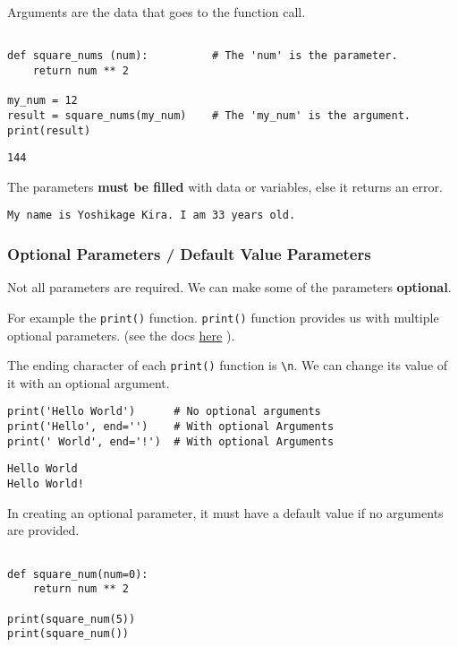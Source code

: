 \documentclass[11pt]{article}
\begin{document}
Arguments are the data that goes to the function call.

\begin{verbatim}

def square_nums (num):          # The 'num' is the parameter.
    return num ** 2

my_num = 12
result = square_nums(my_num)    # The 'my_num' is the argument.
print(result)

\end{verbatim}

\begin{verbatim}
144
\end{verbatim}




The parameters \textbf{must be filled} with data or variables, else it returns an error.


\begin{verbatim}
My name is Yoshikage Kira. I am 33 years old.
\end{verbatim}
\subsubsection{Optional Parameters / Default Value Parameters}
\label{sec:org1132fbe}
Not all parameters are required. We can make some of the parameters \textbf{optional}.

For example the \texttt{print()} function.
\texttt{print()} function provides us with multiple optional parameters. (see the docs \href{https://docs.python.org/3/library/functions.html\#print}{here} ).

The ending character of each \texttt{print()} function is \texttt{\textbackslash{}n}.
We can change its value of it with an optional argument. 
\begin{verbatim}
print('Hello World')      # No optional arguments
print('Hello', end='')    # With optional Arguments
print(' World', end='!')  # With optional Arguments
\end{verbatim}

\begin{verbatim}
Hello World
Hello World!
\end{verbatim}


In creating an optional parameter, it must have a default value if no arguments are provided.

\begin{verbatim}

def square_num(num=0):
    return num ** 2

print(square_num(5))
print(square_num())
\end{verbatim}
\end{document}

